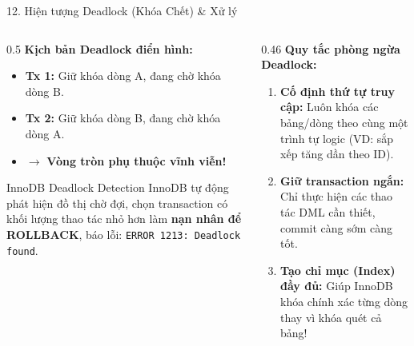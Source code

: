 \documentclass[aspectratio=169,11pt]{beamer}
\newcommand{\code}[1]{\texttt{#1}}
\begin{document}
\begin{frame}[fragile]{12. Hiện tượng Deadlock (Khóa Chết) \& Xử lý}
  \begin{columns}[T]
    \begin{column}{0.5\textwidth}
      \textbf{Kịch bản Deadlock điển hình:}
      \begin{itemize}
        \item \textbf{Tx 1:} Giữ khóa dòng A, đang chờ khóa dòng B.
        \item \textbf{Tx 2:} Giữ khóa dòng B, đang chờ khóa dòng A.
        \item $\rightarrow$ \textbf{Vòng tròn phụ thuộc vĩnh viễn!}
      \end{itemize}
      \vspace{0.3em}
      \begin{exampleblock}{InnoDB Deadlock Detection}
        InnoDB tự động phát hiện đồ thị chờ đợi, chọn transaction có khối lượng thao tác nhỏ hơn làm \textbf{nạn nhân để ROLLBACK}, báo lỗi:
        \code{ERROR 1213: Deadlock found}.
      \end{exampleblock}
    \end{column}
    \begin{column}{0.46\textwidth}
      \textbf{Quy tắc phòng ngừa Deadlock:}
      \begin{enumerate}
        \item \textbf{Cố định thứ tự truy cập:} Luôn khóa các bảng/dòng theo cùng một trình tự logic (VD: sắp xếp tăng dần theo ID).
        \item \textbf{Giữ transaction ngắn:} Chỉ thực hiện các thao tác DML cần thiết, commit càng sớm càng tốt.
        \item \textbf{Tạo chỉ mục (Index) đầy đủ:} Giúp InnoDB khóa chính xác từng dòng thay vì khóa quét cả bảng!
      \end{enumerate}
    \end{column}
  \end{columns}
\end{frame}
\end{document}
